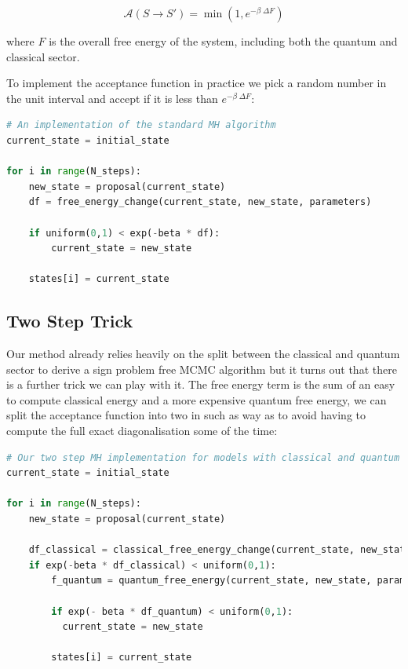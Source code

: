 \[
\mathcal{A}(S \to S') = \min\left(1, e^{-\beta\;\Delta F}\right)
\]

where \(F\) is the overall free energy of the system, including both the quantum and classical sector.

To implement the acceptance function in practice we pick a random number in the unit interval and accept if it is less than \(e^{-\beta\;\Delta F}\):

\begin{lstlisting}[language=Python]
# An implementation of the standard MH algorithm
current_state = initial_state

for i in range(N_steps):
    new_state = proposal(current_state)
    df = free_energy_change(current_state, new_state, parameters)

    if uniform(0,1) < exp(-beta * df):
        current_state = new_state
        
    states[i] = current_state
\end{lstlisting}

\hypertarget{app-mcmc-two-step-trick}{%
\subsection{Two Step Trick}\label{app-mcmc-two-step-trick}}

Our method already relies heavily on the split between the classical and quantum sector to derive a sign problem free MCMC algorithm but it turns out that there is a further trick we can play with it. The free energy term is the sum of an easy to compute classical energy and a more expensive quantum free energy, we can split the acceptance function into two in such as way as to avoid having to compute the full exact diagonalisation some of the time:

\begin{lstlisting}[language=Python]
# Our two step MH implementation for models with classical and quantum energy terms
current_state = initial_state

for i in range(N_steps):
    new_state = proposal(current_state)

    df_classical = classical_free_energy_change(current_state, new_state, parameters)
    if exp(-beta * df_classical) < uniform(0,1):
        f_quantum = quantum_free_energy(current_state, new_state, parameters)
    
        if exp(- beta * df_quantum) < uniform(0,1):
          current_state = new_state
    
        states[i] = current_state
    
\end{lstlisting}


